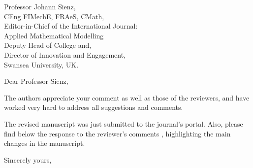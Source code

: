\documentclass[11pt]{letter} %
\begin{document}

\begin{letter}{Professor Johann Sienz, \\CEng FIMechE, FRAeS, CMath, \\Editor-in-Chief of the International Journal: \\Applied Mathematical Modelling \\Deputy Head of College and, \\Director of Innovation and Engagement, \\
Swansea University, UK.}






\opening{Dear Professor Sienz,} 
 
The authors appreciate your comment as well as those of the reviewers, and have worked very hard to address all suggestions and comments.

The revised manuscript was just submitted to the journal's portal. Also, please find below the response to the reviewer's comments , highlighting the main changes in the manuscript.

\closing{Sincerely yours,}



\end{letter}
\end{document}
